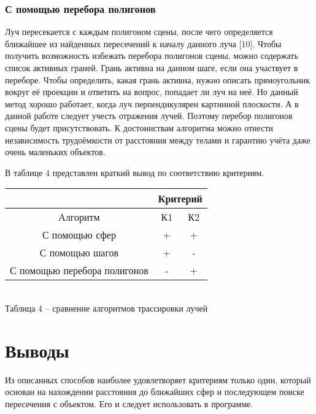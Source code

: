 {    \subsubsection{С помощью перебора полигонов} {
        Луч пересекается с каждым полигоном сцены, после чего определяется ближайшее
        из найденных пересечений к началу данного луча [10].
        Чтобы получить возможность избежать перебора полигонов сцены, можно содержать
        список активных граней.
        Грань активна на данном шаге, если она участвует в переборе.
        Чтобы определить, какая грань активна, нужно описать прямоугольник вокруг
        её проекции и ответить на вопрос, попадает ли луч на неё.
        Но данный метод хорошо работает, когда луч перпендикулярен
        картинной плоскости.
        А в данной работе следует учесть отражения лучей.
        Поэтому перебор полигонов сцены будет присутствовать.
        К достоинствам алгоритма можно отнести независимость трудоёмкости от расстояния между телами и гарантию учёта даже очень маленьких объектов.
    }

    В таблице 4 представлен краткий вывод по соответствию критериям.
    
    \begin{center}
        \begin{tabular} { |c|c|c| }
            \hline
            \hspace{0pt} & \multicolumn{2}{|c|}{Критерий} \\
            \hline
            Алгоритм & К1 & К2 \\
            \hline
            С помощью сфер & + & + \\
            \hline
            С помощью шагов & + & - \\
            \hline
            С помощью перебора полигонов & - & + \\
            \hline
        \end{tabular}
        \\
    \vspace{2mm}
    \small { Таблица 4 -- сравнение алгоритмов трассировки лучей }
    \end{center}

    \section*{Выводы} {
        Из описанных способов наиболее удовлетворяет критериям только
        один, который основан на нахождении расстояния до ближайших сфер
        и последующем поиске пересечения с объектом.
        Его и следует использовать в программе.
    }
}